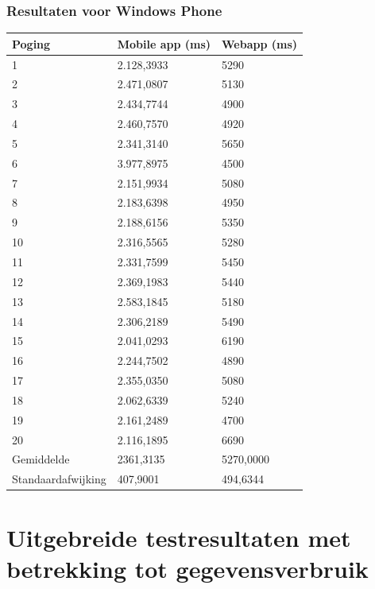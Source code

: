 \documentclass[pdftex,a4paper,12pt,twoside]{report}
\begin{document}
\subsection{Resultaten voor Windows Phone}
\begin{center}
  \begin{tabular}{ | l | l | l |}
      \hline
      Poging & Mobile app (ms) & Webapp (ms)
      \\ \hline
      1 & 2.128,3933 & 5290
      \\ \hline
      2 & 2.471,0807 & 5130
      \\ \hline
      3 & 2.434,7744 & 4900
      \\ \hline
      4 & 2.460,7570 & 4920
      \\ \hline
      5 & 2.341,3140 & 5650
      \\ \hline
      6 & 3.977,8975 & 4500
      \\ \hline
      7 & 2.151,9934 & 5080
      \\ \hline
      8 & 2.183,6398 & 4950
      \\ \hline
      9 & 2.188,6156 & 5350
      \\ \hline
      10 & 2.316,5565 & 5280
      \\ \hline
      11 & 2.331,7599 & 5450
      \\ \hline
      12 & 2.369,1983 & 5440
      \\ \hline
      13 & 2.583,1845 & 5180
      \\ \hline
      14 & 2.306,2189 & 5490
      \\ \hline
      15 & 2.041,0293 & 6190
      \\ \hline
      16 & 2.244,7502 & 4890
      \\ \hline
      17 & 2.355,0350 & 5080
      \\ \hline
      18 & 2.062,6339& 5240
      \\ \hline
      19 & 2.161,2489 & 4700
      \\ \hline
      20 & 2.116,1895 & 6690
      \\ \hline
      Gemiddelde & 2361,3135 & 5270,0000
      \\ \hline
      Standaardafwijking & 407,9001 & 494,6344
      \\ \hline
   \end{tabular}
\end{center}
\chapter{Uitgebreide testresultaten met betrekking tot gegevensverbruik}
\end{document}
